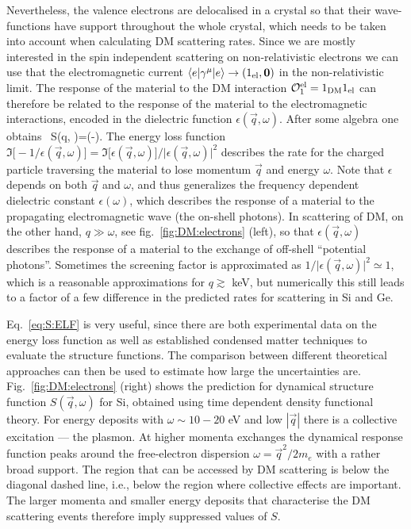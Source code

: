 Nevertheless, 
the valence electrons are delocalised in a crystal
so that their wave-functions have support throughout the whole crystal, which needs to be taken into account when calculating DM scattering rates. Since we are mostly interested in the spin independent scattering on non-relativistic electrons we can use that the electromagnetic current $\langle e |\gamma^\mu |e\rangle\to (1_{\rm el},\vec 0)$ in the non-relativistic limit. The response of the material to the DM interaction ${\mathcal O}_1^{\rm el}= 1_{\rm DM} 1_{\rm el}$ can therefore be related to the response of the material to the electromagnetic interactions, encoded in the dielectric function $\epsilon(\vec q , \omega)$.  After some algebra one obtains~\cite{Knapen:2021run,cond-mat-book}
\beq
\label{eq:S:ELF}
S(\vec q, \omega)=\Im \biggr(-\biggr).
\eeq
The energy loss function $\Im\big[-1/\epsilon(\vec q,\omega)\big]=\Im\big[\epsilon(\vec q,\omega)\big]/\big|\epsilon(\vec q,\omega)\big|^2$ describes the rate for the charged particle traversing the material to lose momentum $\vec q$ and energy $\omega$. 
Note that $\epsilon$ depends on both $\vec q$ and $\omega$, and thus generalizes the frequency dependent dielectric constant $\epsilon(\omega)$, which describes the response of  a material to the propagating electromagnetic wave (the on-shell photons). 
In scattering of DM, on the other hand, $q\gg\omega$, see fig.~\ref{fig:DM:electrons} (left), so that $\epsilon(\vec q, \omega)$ describes the response of a material to the exchange of off-shell ``potential photons''. 
Sometimes  the screening factor is approximated as $1/\big|\epsilon(\vec q,\omega)\big|^2 \simeq 1$, which is a reasonable approximations for $q\gtrsim $ keV, 
but numerically this still leads to a factor of a few difference in the predicted rates for scattering in Si and Ge. 

Eq.~\eqref{eq:S:ELF} is very useful, since there are both experimental data on the energy loss function as well as established condensed matter techniques to evaluate the structure functions. 
The comparison between different theoretical approaches can then be used to estimate how large the uncertainties are. 
Fig.~\ref{fig:DM:electrons} (right) shows the prediction for dynamical structure function $S(\vec q, \omega)$ for Si, obtained using time dependent density functional theory.  For energy deposits with $\omega \sim 10-20$ eV and low $|\vec q|$  there is a collective excitation --- the plasmon. At higher momenta exchanges the dynamical response function peaks around the free-electron dispersion $\omega =\vec q^2/2 m_e$ with a rather broad support. The region that can be accessed by DM scattering is below the diagonal dashed line, i.e., below the region where collective effects are important. The larger momenta and smaller energy deposits that characterise the DM scattering events therefore  imply suppressed values of $S$. 

